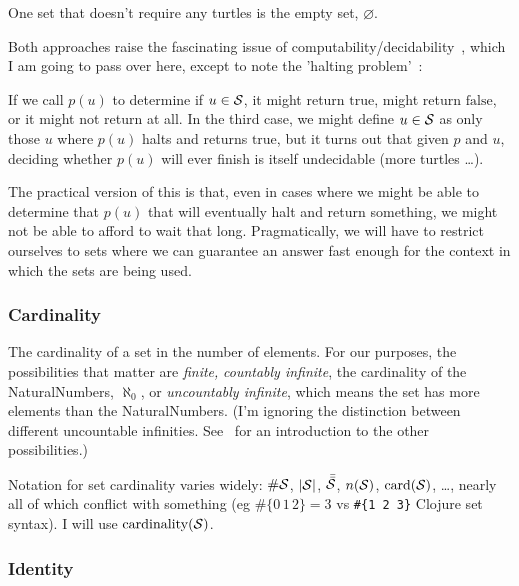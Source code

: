 One set that doesn't require any turtles is 
the empty set, $\varnothing$.


Both approaches raise the fascinating issue of 
computability/decidability~\cite{church1936unsolvable,
turing1936computability,
turing1938computable-correction,
turing1937computability-lambda},
which I am going to pass over here, except to note the 
'halting problem'~\cite{wiki:Halting-problem}:

If we call $p(u)$ to determine if $u \in \mathcal{S}$, 
it might return $\text{true}$, might return $\text{false}$,
or it might not return at all.
In the third case, we might define $u \in \mathcal{S}$ as only those
$u$ where $p(u)$ halts and returns $\text{true}$, but it turns 
out that given $p$ and $u$, deciding whether $p(u)$ will ever
finish is itself undecidable (more turtles \ldots).

The practical version of this is that, even in cases where we
might be able to determine that $p(u)$ that will eventually halt
and return something, we might not be able to afford to wait that
long.
Pragmatically, we will have to restrict ourselves to sets where we
can guarantee an answer fast enough for the context in which the
sets are being used.

\subsubsection{Cardinality}

The cardinality of a set in the number of elements.
For our purposes, the possibilities that matter are \emph{finite,}
\emph{countably infinite}, the cardinality of the
\gls{NaturalNumbers}, $\aleph_{0}$, or \emph{uncountably
infinite}, which means the set has more elements than the
\gls{NaturalNumbers}.
(I'm ignoring the distinction between different uncountable
infinities.
See~\cite{wiki:cardinal-number} for an introduction to the other
possibilities.)

Notation for set cardinality varies widely:
$\#\mathcal{S}$,  $|\mathcal{S}|$,
$\bar{\bar{\mathcal{S}}}$, $n(\mathcal{S})$,
$\text{card}(\mathcal{S})$, \ldots, nearly all of which conflict
with something (eg $\#\{ 0 \, 1 \, 2 \} = 3$ vs 
\lstinline|#{1 2 3}| Clojure set syntax).
I will use $\text{cardinality}(\mathcal{S})$.

 
\subsubsection{Identity}

